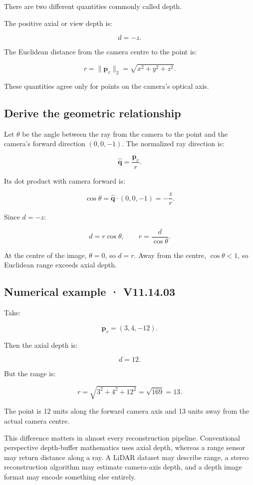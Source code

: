 There are two different quantities commonly called depth.

The positive axial or view depth is:

\[ \boxed{d=-z}. \]

The Euclidean distance from the camera centre to the point is:

\[ \boxed{ r=\|\mathbf p_v\|_2=\sqrt{x^2+y^2+z^2}. } \]

These quantities agree only for points on the camera's optical axis.

\subsection{Derive the geometric relationship}\label{02-foundations-ii-ch035-derive-the-geometric-relationship}

Let \(\theta\) be the angle between the ray from the camera to the point and the camera's forward direction \((0,0,-1)\). The normalized ray direction is:

\[ \hat{\mathbf q}=\frac{\mathbf p_v}{r}. \]

Its dot product with camera forward is:

\[ \cos\theta = \hat{\mathbf q}\cdot(0,0,-1) = -\frac zr. \]

Since \(d=-z\):

\[ \boxed{d=r\cos\theta}, \qquad \boxed{r=\frac d{\cos\theta}}. \]

At the centre of the image, \(\theta=0\), so \(d=r\). Away from the centre, \(\cos\theta<1\), so Euclidean range exceeds axial depth.

\subsection{Numerical example · V11.14.03}\label{02-foundations-ii-ch035-numerical-example-v11.14.03}

Take:

\[ \mathbf p_v=(3,4,-12). \]

Then the axial depth is:

\[ \boxed{d=12}. \]

But the range is:

\[ r=\sqrt{3^2+4^2+12^2} =\sqrt{169} =\boxed{13}. \]

The point is 12 units along the forward camera axis and 13 units away from the actual camera centre.

This difference matters in almost every reconstruction pipeline. Conventional perspective depth-buffer mathematics uses axial depth, whereas a range sensor may return distance along a ray. A LiDAR dataset may describe range, a stereo reconstruction algorithm may estimate camera-axis depth, and a depth image format may encode something else entirely.


